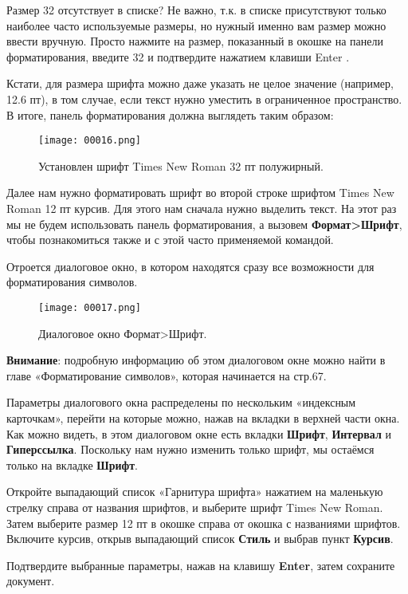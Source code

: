 \documentclass[a4paper,10pt]{article}
\begin{document}
Размер 32 отсутствует в списке? Не важно, т.к. в списке присутствуют только наиболее часто используемые размеры, но нужный именно вам размер можно ввести вручную. Просто нажмите на размер, показанный в окошке на панели форматирования, введите 32 и подтвердите нажатием клавиши Enter \keys{\return}.

Кстати, для размера шрифта можно даже указать не целое значение (например, 12.6 пт), в том случае, если текст нужно уместить в ограниченное пространство.
В итоге, панель форматирования должна выглядеть таким образом:

\begin{figure}[ht]
\texttt{[image: 00016.png]}
\centering
\caption{Установлен шрифт Times New Roman 32 пт полужирный.}
\end{figure}

Далее нам нужно форматировать шрифт во второй строке шрифтом Times New Roman 12 пт курсив. Для этого нам сначала нужно выделить текст. На этот раз мы не будем использовать панель форматирования, а вызовем \textbf{Формат>Шрифт}, чтобы познакомиться также и с этой часто применяемой командой.

Отроется диалоговое окно, в котором находятся сразу все возможности для форматирования символов.

\begin{figure}[ht]
\texttt{[image: 00017.png]}
\centering
\caption{Диалоговое окно Формат>Шрифт.}
\end{figure}

\textbf{Внимание}: подробную информацию об этом диалоговом окне можно найти в главе «Форматирование символов», которая начинается на стр.67.

Параметры диалогового окна распределены по нескольким «индексным карточкам», перейти на которые можно, нажав на вкладки в верхней части окна. Как можно видеть, в этом диалоговом окне есть вкладки \textbf{Шрифт}, \textbf{Интервал} и \textbf{Гиперссылка}. Поскольку нам нужно изменить только шрифт, мы остаёмся только на вкладке \textbf{Шрифт}.

Откройте выпадающий список «Гарнитура шрифта» нажатием на маленькую стрелку справа от названия шрифтов, и выберите шрифт Times New Roman. Затем выберите размер 12 пт в окошке справа от окошка с названиями шрифтов. Включите курсив, открыв выпадающий список \textbf{Стиль} и выбрав пункт \textbf{Курсив}.

Подтвердите выбранные параметры, нажав на клавишу \textbf{Enter}, затем сохраните документ.
\end{document}
